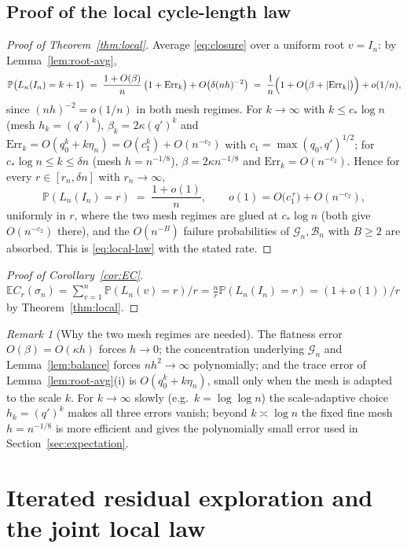 \documentclass[11pt]{article}
\newcommand{\E}{\mathbb{E}}
\newcommand{\Prob}{\mathbb{P}}
\newcommand{\1}{\mathbf{1}}
\newcommand{\Err}{\mathrm{Err}}
\newcommand{\cB}{\mathcal{B}}
\newcommand{\cG}{\mathcal{G}}
\theoremstyle{remark}
\newtheorem{remark}[theorem]{Remark}
\begin{document}
\subsection{Proof of the local cycle-length law}
\begin{proof}[Proof of Theorem~\ref{thm:local}]
Average \eqref{eq:closure} over a uniform root $v=I_n$: by
Lemma~\ref{lem:root-avg},
\begin{equation}\label{eq:local-pf}
\Prob\bigl(L_n(I_n)=k+1\bigr)
\;=\;\frac{1+O(\beta)}{n}\,\bigl(1+\Err_k\bigr)+O\bigl(\delta(nh)^{-2}\bigr)
\;=\;\frac1n\Bigl(1+O\bigl(\beta+|\Err_k|\bigr)\Bigr)+o(1/n),
\end{equation}
since $(nh)^{-2}=o(1/n)$ in both mesh regimes. For $k\to\infty$ with
$k\le c_*\log n$ (mesh $h_k=(q')^k$), $\beta_k=2\kappa(q')^k$ and
$\Err_k=O(q_0^k+k\eta_n)=O(c_1^k)+O(n^{-c_2})$ with
$c_1=\max(q_0,q')^{1/2}$; for $c_*\log n\le k\le\delta n$ (mesh
$h=n^{-1/8}$), $\beta=2\kappa n^{-1/8}$ and $\Err_k=O(n^{-c_2})$. Hence for
every $r\in[r_n,\delta n]$ with $r_n\to\infty$,
\[
\Prob(L_n(I_n)=r)\;=\;\frac{1+o(1)}{n},
\qquad o(1)=O\bigl(c_1^{\,r}\bigr)+O(n^{-c_2}),
\]
uniformly in $r$, where the two mesh regimes are glued at
$c_*\log n$ (both give $O(n^{-c_2})$ there), and the $O(n^{-B})$ failure
probabilities of $\cG_n,\cB_n$ with $B\ge2$ are absorbed. This is
\eqref{eq:local-law} with the stated rate.
\end{proof}

\begin{proof}[Proof of Corollary~\ref{cor:EC}]
$\E C_r(\sigma_n)=\sum_{v=1}^n\Prob(L_n(v)=r)/r
=\frac{n}{r}\Prob(L_n(I_n)=r)=(1+o(1))/r$ by
Theorem~\ref{thm:local}.
\end{proof}

\begin{remark}[Why the two mesh regimes are needed]\label{rem:two-mesh}
The flatness error $O(\beta)=O(\kappa h)$ forces $h\to0$; the concentration
underlying $\cG_n$ and Lemma~\ref{lem:balance} forces $nh^2\to\infty$
polynomially; and the trace error of Lemma~\ref{lem:root-avg}(i) is
$O(q_0^k+k\eta_n)$, small only when the mesh is adapted to the scale $k$.
For $k\to\infty$ slowly (e.g.\ $k=\log\log n$) the scale-adaptive choice
$h_k=(q')^k$ makes all three errors vanish; beyond $k\asymp\log n$ the fixed
fine mesh $h=n^{-1/8}$ is more efficient and gives the polynomially small
error used in Section~\ref{sec:expectation}.
\end{remark}

\section{Iterated residual exploration and the joint local law}\label{sec:joint}
\end{document}
